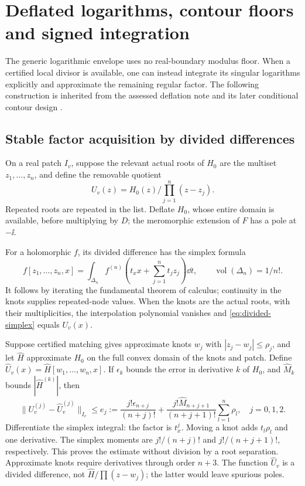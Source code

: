 \section{Deflated logarithms, contour floors and signed integration}
\label{sec:deflation}

The generic logarithmic envelope uses no real-boundary modulus floor.
When a certified local divisor is available, one can instead integrate
its singular logarithms explicitly and approximate the remaining regular
factor. The following construction is inherited from the assessed
deflation note and its later conditional contour design
\cite{OGDeflation,OGDeflationAssessment,OGContourDesign}.

\subsection{Stable factor acquisition by divided differences}
On a real patch \(I_v\), suppose the relevant actual roots of \(H_0\)
are the multiset \(z_1,\ldots,z_n\), and define the removable quotient
\[
 U_v(z)=H_0(z)\Big/\prod_{j=1}^n(z-z_j).
\]
Repeated roots are repeated in the list. Deflate \(H_0\), whose entire
domain is available, before multiplying by \(D\); the meromorphic
extension of \(F\) has a pole at \(-\ii\).

For a holomorphic \(f\), its divided difference has the simplex formula
\begin{equation}\label{eq:divided-simplex}
 f[z_1,\ldots,z_n,x]
 =\int_{\Delta_n}f^{(n)}\left(t_xx+\sum_{j=1}^nt_jz_j\right)\dd t,
 \qquad \operatorname{vol}(\Delta_n)=1/n!.
\end{equation}
It follows by iterating the fundamental theorem of calculus; continuity
in the knots supplies repeated-node values. When the knots are the
actual roots, with their multiplicities, the interpolation polynomial
vanishes and \eqref{eq:divided-simplex} equals \(U_v(x)\).

Suppose certified matching gives approximate knots \(w_j\) with
\(|z_j-w_j|\le\rho_j\), and let \(\widehat H\) approximate \(H_0\)
on the full convex domain of the knots and patch. Define
\(\widehat U_v(x)=\widehat H[w_1,\ldots,w_n,x]\).
If \(\epsilon_k\) bounds the error in derivative \(k\) of \(H_0\), and
\(\widehat M_k\) bounds \(|\widehat H^{(k)}|\), then
\begin{equation}\label{eq:deflated-errors}
 \|U_v^{(j)}-\widehat U_v^{(j)}\|_{I_v}
 \le e_j:=\frac{j!\epsilon_{n+j}}{(n+j)!}
       +\frac{j!\widehat M_{n+j+1}}{(n+j+1)!}\sum_{l=1}^n\rho_l,
 \quad j=0,1,2.
\end{equation}
Differentiate the simplex integral: the factor is \(t_x^j\).
Moving a knot adds \(t_l\rho_l\) and one derivative. The simplex
moments are \(j!/(n+j)!\) and \(j!/(n+j+1)!\), respectively.
This proves the estimate without division by a root separation.
Approximate knots require derivatives through order \(n+3\).
The function \(\widehat U_v\) is a divided difference, not
\(\widehat H/\prod(z-w_j)\); the latter would leave spurious poles.

